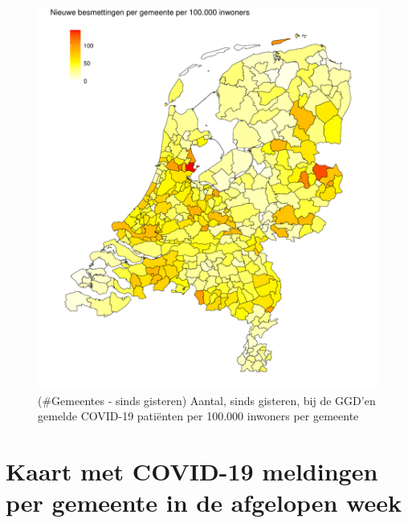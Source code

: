 \documentclass[
  english,
  man,floatsintext]{apa6}
\begin{document}
\begin{figure}
\centering
\includegraphics{daily_report_files/figure-latex/Gemeentes - sinds gisteren-1.pdf}
\caption{(\#Gemeentes - sinds gisteren) Aantal, sinds gisteren, bij de GGD'en gemelde COVID-19 patiënten per 100.000 inwoners per gemeente}
\end{figure}

\newpage

\hypertarget{kaart-met-covid-19-meldingen-per-gemeente-in-de-afgelopen-week}{%
\section{Kaart met COVID-19 meldingen per gemeente in de afgelopen week}\label{kaart-met-covid-19-meldingen-per-gemeente-in-de-afgelopen-week}}
\end{document}
